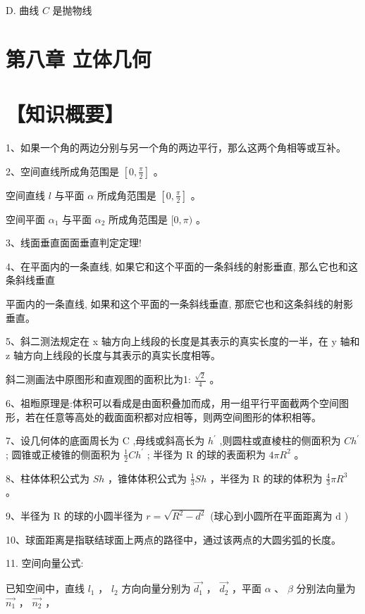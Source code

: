 \documentclass[10pt]{article}
\begin{document}
D. 曲线 \(C\) 是抛物线

\section*{第八章 立体几何}

\section*{【知识概要】}

1、如果一个角的两边分别与另一个角的两边平行，那么这两个角相等或互补。

2、空间直线所成角范围是 \(\left\lbrack  {0,\frac{\pi }{2}}\right\rbrack\) 。

空间直线 \(l\) 与平面 \(\alpha\) 所成角范围是 \(\left\lbrack  {0,\frac{\pi }{2}}\right\rbrack\) 。

空间平面 \({\alpha }_{1}\) 与平面 \({\alpha }_{2}\) 所成角范围是 \(\lbrack 0,\pi )\) 。

3、线面垂直面面垂直判定定理!

4、在平面内的一条直线, 如果它和这个平面的一条斜线的射影垂直, 那么它也和这条斜线垂直

平面内的一条直线, 如果和这个平面的一条斜线垂直, 那麽它也和这条斜线的射影垂直。

5、斜二测法规定在 x 轴方向上线段的长度是其表示的真实长度的一半，在 y 轴和 z 轴方向上线段的长度与其表示的真实长度相等。

斜二测画法中原图形和直观图的面积比为1: \(\frac{\sqrt{2}}{4}\) 。

6、祖暅原理是:体积可以看成是由面积叠加而成，用一组平行平面截两个空间图形，若在任意等高处的截面面积都对应相等，则两空间图形的体积相等。

7、设几何体的底面周长为 \(\mathrm{C}\) ,母线或斜高长为 \({h}^{\prime }\) ,则圆柱或直棱柱的侧面积为 \(C{h}^{\prime }\) ; 圆锥或正棱锥的侧面积为 \(\frac{1}{2}C{h}^{\prime }\) ; 半径为 \(\mathrm{R}\) 的球的表面积为 \({4\pi }{R}^{2}\) 。

8、柱体体积公式为 \({Sh}\) ，锥体体积公式为 \(\frac{1}{3}{Sh}\) ，半径为 \(\mathrm{R}\) 的球的体积为 \(\frac{4}{3}\pi {R}^{3}\) 。

9、半径为 \(\mathrm{R}\) 的球的小圆半径为 \(r = \sqrt{{R}^{2} - {d}^{2}}\) (球心到小圆所在平面距离为 \(\mathrm{d}\) )

10、球面距离是指联结球面上两点的路径中，通过该两点的大圆劣弧的长度。

11. 空间向量公式:

已知空间中，直线 \({l}_{1}\) ， \({l}_{2}\) 方向向量分别为 \(\overrightarrow{{d}_{1}}\) ， \(\overrightarrow{{d}_{2}}\) ，平面 \(\alpha\) 、 \(\beta\) 分别法向量为 \(\overrightarrow{{n}_{1}}\) ， \(\overrightarrow{{n}_{2}}\) ，
\end{document}
